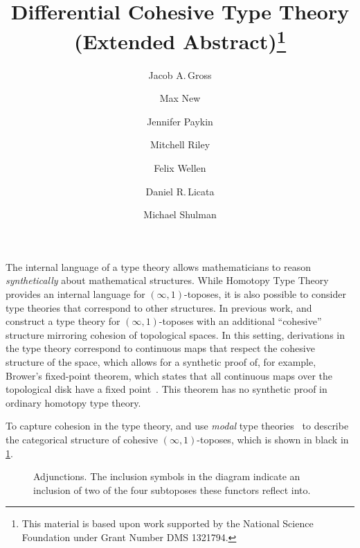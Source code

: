\documentclass{article}
\title{Differential Cohesive Type Theory (Extended Abstract)\thanks{This
    material is based upon work supported by the National Science Foundation
    under Grant Number DMS 1321794.}}
\author{Jacob A.\,Gross}
\affil[1]{University of Pittsburgh}
\author[2]{Max New}
\affil[2]{Northeastern University}
\author[3]{Jennifer Paykin}
\affil[3]{University of Pennsylvania}
\author[4]{Mitchell Riley}
\affil[4]{Wesleyan University}
\author[5]{Felix Wellen}
\affil[5]{Karlsruhe Institute of Technology}
\author[4]{Daniel R.\,Licata}
\author[6]{Michael Shulman}
\affil[6]{University of San Diego}
\date{}
\begin{document}
\maketitle
{}


The internal language of a type theory allows mathematicians to reason
\emph{synthetically} about mathematical structures. While Homotopy Type Theory
provides an internal language for $(∞,1)$-toposes, it is also possible to
consider type theories that correspond to other structures. In previous work,
\citet{Shulman2015} and \citet{Licata2016} construct a type theory for
$(∞,1)$-toposes with an additional ``cohesive'' structure mirroring cohesion of
topological spaces. In this setting, derivations in the type theory correspond
to continuous maps that respect the cohesive structure of the space, which
allows for a synthetic proof of, for example, Brower's fixed-point theorem,
which states that all continuous maps over the topological disk have a fixed
point~\citep{Shulman2015}. This theorem has no synthetic proof in ordinary
homotopy type theory.

To capture cohesion in the type theory, \citep{Shulman2015} and
\citep{Licata2016} use \emph{modal} type theories~
to describe the categorical structure of cohesive $(∞,1)$-toposes, which is
shown in black in \cref{fig:modalities}. 

\begin{figure}
\begin{center}
\end{center}
\caption{Adjunctions.  The inclusion symbols in
  the diagram indicate an inclusion of two of the four subtoposes these functors
  reflect into. }
\label{fig:modalities}
\end{figure}
\end{document}
